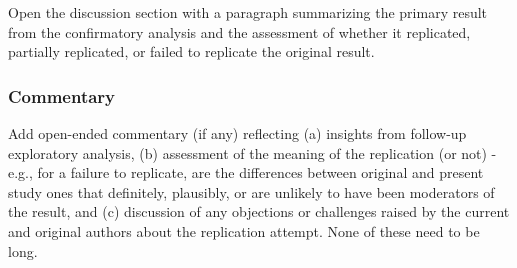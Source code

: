 \documentclass[]{article}
\begin{document}
Open the discussion section with a paragraph summarizing the primary
result from the confirmatory analysis and the assessment of whether it
replicated, partially replicated, or failed to replicate the original
result.

\hypertarget{commentary}{%
\subsubsection{Commentary}\label{commentary}}

Add open-ended commentary (if any) reflecting (a) insights from
follow-up exploratory analysis, (b) assessment of the meaning of the
replication (or not) - e.g., for a failure to replicate, are the
differences between original and present study ones that definitely,
plausibly, or are unlikely to have been moderators of the result, and
(c) discussion of any objections or challenges raised by the current and
original authors about the replication attempt. None of these need to be
long.
\end{document}
